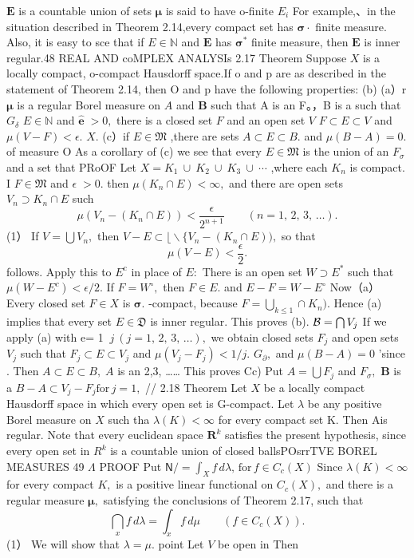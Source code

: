 $\boldsymbol{E}$ is a countable union of sets $\boldsymbol{\mu}$ is said to have o-finite $E_{i}$ For example,、in the situation described in Theorem 2.14,every compact set has ${\boldsymbol{\sigma}}\cdot$ finite measure. Also, it is easy to sce that if $E\in\mathbb{N}$ and $\boldsymbol{E}$ has ${\boldsymbol{\sigma}}^{*}$ finite measure, then $\boldsymbol{E}$ is inner regular.48 REAL AND coMPLEX ANALYSIs 2.17 Theorem Suppose $\textstyle X$ is a locally compact, o-compact Hausdorff space.If o and p are as described in the statement of Theorem 2.14, then O and p have the following properties: (b) (a）r ${\boldsymbol{\mu}}$ is a regular Borel measure on $\scriptstyle A$ and $\boldsymbol{B}$ such that A is an F。，B is a such that $G_{\delta}$ $E\in\mathbb{N}$ and $\scriptstyle\mathbf{\hat{e}}\;>0,$ there is a closed set ${\mathbf{}}F$ and an open set ${\mathbf{}}V$ $F\subset E\subset V$ and $\mu(V-F)<\epsilon.$ $X.$ (c）if $E\in{\mathfrak{M}}$ ,there are sets $A\subset E\subset B.$ and $\mu(B-A)=0.$ of measure O As a corollary of (c) we see that every $E\in{\mathfrak{M}}$ is the union of an $F_{\sigma}$ and a set that PRoOF Let $X=K_{1}\ \cup\ K_{2}\ \cup\ K_{3}\ \cup\ \cdots$ ,where each $K_{n}$ is compact. I $F\in{\mathfrak{M}}$ and $\scriptstyle\epsilon\;>0.$ then $\mu(K_{n}\cap E)<\infty,$ and there are open sets $V_{n}\supset K_{n}\cap E$ such $$ \mu(V_{n}-(K_{n}\cap E))<\frac{\epsilon}{2^{n+1}}\qquad(n=1,\,2,\,3,\,\ldots). $$ (1） If $V=\bigcup V_{n},$ then $V-E\subset{\big\lfloor}\backslash\{V_{n}-(K_{n}\cap E)),$ so that $$ \mu(V-E)<{\frac{\epsilon}{2}}. $$ follows. Apply this to $E^{\mathrm{c}}$ in place of $E{\mathrel{:}}$ There is an open set $W\supset E^{*}$ such that $\mu(W-E^{c})<\epsilon/2.$ If $F=W^{\circ},$ then $F\in E.$ and $E-F=W-E^{\circ}$ Now（a） Every closed set $\scriptstyle{F\in X}$ is ${\boldsymbol{\sigma}}.$ -compact, because $F=\bigcup_{k\leq1}\cap K_{n}).$ Hence (a) implies that every set $E\in{\mathfrak{D}}$ is inner regular. This proves (b). ${\cal B}=\bigcap{V}_{j}$ If we apply (a) with e= 1 $~j~(j=1,\,2,\,3,\,\ldots),$ we obtain closed sets $F_{j}$ and open sets ${\mathit{V}}_{j}$ such that $F_{j}\subset E\subset V_{j}$ and $\mu(V_{j}-F_{j})<1/j.$ $G_{\partial},$ and $\mu(B-A)=0$ 'since . Then $A\subset E\subset B,\;A$ is an 2,3, …… This proves Cc) Put $A=\bigcup F_{j}$ and $F_{\sigma},$ $\boldsymbol{B}$ is a $B-A\subset V_{j}-F_{j}\mathrm{for}\,j=1,$ // 2.18 Theorem Let $X$ be a locally compact Hausdorff space in which every open set is G-compact. Let $\lambda$ be any positive Borel measure on $X$ such tha $\lambda(K)<\infty$ for every compact set K. Then Ais regular. Note that every euclidean space ${\boldsymbol{R}}^{k}$ satisfies the present hypothesis, since every open set in $R^{k}$ is a countable union of closed ballsPOsrrTVE BOREL MEASURES 49 $\Lambda$ PROOF Put ${\mathsf{N}}/=\int_{X}f\,d{\lambda},\,{\mathrm{for}}\,f\in C_{c}(X)$ Since $\lambda(K)<\infty$ for every compact $K,$ is a positive linear functional on $C_{c}(X),$ and there is a regular measure ${\boldsymbol{\mu}},$ satisfying the conclusions of Theorem 2.17, such that $$ \bigcap_{x}f\,d\lambda=\int_{x}f\,d\mu\qquad(f\in C_{c}(X)). $$ (1） We will show that $\lambda=\mu.$ point Let ${\mathbf{}}V$ be open in Then 